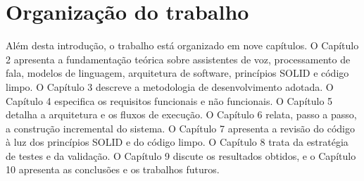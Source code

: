 \section{Organização do trabalho}

Além desta introdução, o trabalho está organizado em nove capítulos. O Capítulo 2 apresenta a
fundamentação teórica sobre assistentes de voz, processamento de fala, modelos de linguagem,
arquitetura de software, princípios SOLID e código limpo. O Capítulo 3 descreve a metodologia de
desenvolvimento adotada. O Capítulo 4 especifica os requisitos funcionais e não funcionais. O
Capítulo 5 detalha a arquitetura e os fluxos de execução. O Capítulo 6 relata, passo a passo, a
construção incremental do sistema. O Capítulo 7 apresenta a revisão do código à luz dos princípios
SOLID e do código limpo. O Capítulo 8 trata da estratégia de testes e da validação. O Capítulo 9
discute os resultados obtidos, e o Capítulo 10 apresenta as conclusões e os trabalhos futuros.
